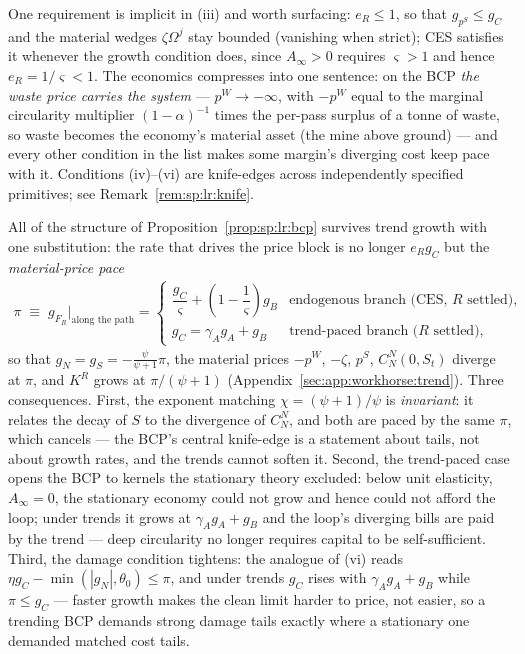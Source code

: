 One requirement is implicit in (iii) and worth surfacing: $e_R\le1$, so that
$g_{p^S}\le g_C$ and the material wedges $\zeta\Omega^j$ stay bounded (vanishing when strict);
CES satisfies it whenever the growth condition does, since $A_\infty>0$ requires
$\varsigma>1$ and hence $e_R=1/\varsigma<1$. The economics compresses into one sentence: on the
BCP \emph{the waste price carries the system} --- $p^W\to-\infty$, with $-p^W$ equal to the
marginal circularity multiplier $\left(1-\alpha\right)^{-1}$ times the per-pass surplus of a
tonne of waste, so waste becomes the economy's material asset (the mine above ground) --- and
every other condition in the list makes some margin's diverging cost keep pace with it.
Conditions (iv)--(vi) are knife-edges across independently specified primitives; see
Remark~\ref{rem:sp:lr:knife}.

 All of the structure of
Proposition~\ref{prop:sp:lr:bcp} survives trend growth with one substitution: the rate that
drives the price block is no longer $e_Rg_C$ but the \emph{material-price pace}
\begin{align}
\pi\;\equiv\;g_{F_R}\Big|_{\text{along the path}}
=\begin{cases}
\dfrac{g_C}{\varsigma}+\left(1-\dfrac{1}{\varsigma}\right)g_B
& \text{endogenous branch (CES, $R$ settled),}\\[0.8em]
g_C=\gamma_Ag_A+g_B
& \text{trend-paced branch ($R$ settled),}
\end{cases}
\label{eq:sp:lr:pace-price}
\end{align}
so that $g_N=g_S=-\frac{\psi}{\psi+1}\pi$, the material prices $-p^W$, $-\zeta$, $p^S$,
$C^N_N\left(0,S_t\right)$ diverge at $\pi$, and $K^R$ grows at $\pi/\left(\psi+1\right)$
(Appendix~\ref{sec:app:workhorse:trend}). Three consequences. First, the exponent matching
$\chi=\left(\psi+1\right)/\psi$ is \emph{invariant}: it relates the decay of $S$ to the
divergence of $C^N_N$, and both are paced by the same $\pi$, which cancels --- the BCP's
central knife-edge is a statement about tails, not about growth rates, and the trends cannot
soften it. Second, the trend-paced case opens the BCP to kernels the stationary theory
excluded: below unit elasticity, $A_\infty=0$, the stationary economy could not grow and
hence could not afford the loop; under trends it grows at
$\gamma_Ag_A+g_B$ and the loop's diverging bills are paid by the trend --- deep circularity
no longer requires capital to be self-sufficient. Third, the damage condition tightens: the
analogue of (vi) reads $\eta g_C-\min\left(\left|g_N\right|,\theta_0\right)\le\pi$, and
under trends $g_C$ rises with $\gamma_Ag_A+g_B$ while $\pi\le g_C$ --- faster growth makes
the clean limit harder to price, not easier, so a trending BCP demands strong damage tails
exactly where a stationary one demanded matched cost tails.


